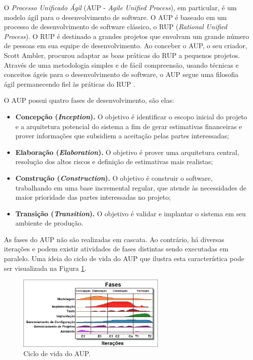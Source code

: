 O \emph{Processo Unificado Ágil} (AUP - \textit{Agile Unified Process}), em particular, é um modelo ágil para o desenvolvimento de software. O AUP é baseado em um processo de desenvolvimento de software clássico, o RUP (\textit{Rational Unified Process}). O RUP é destinado a grandes projetos que envolvam um grande número de pessoas em sua equipe de desenvolvimento. Ao conceber o AUP, o seu criador, Scott Ambler, procurou adaptar as boas práticas do RUP a pequenos projetos. Através de uma metodologia simples e de fácil compreensão, usando técnicas e conceitos ágeis para o desenvolvimento de software, o AUP segue uma filosofia ágil permanecendo fiel às práticas do RUP \cite{Ambler:Livro}.


O AUP possui quatro fases de desenvolvimento, são elas:

\begin{itemize}
	\item \textbf{Concepção (\textit{Inception}).} O objetivo é identificar o escopo inicial do projeto e a arquitetura potencial do sistema a fim de gerar estimativas financeiras e prover informações que subsidiem a aceitação pelas partes interessadas;
	\item \textbf{Elaboração (\textit{Elaboration}).} O objetivo é prover uma arquitetura central, resolução dos altos riscos e definição de estimativas mais realistas;
	\item \textbf{Construção (\textit{Construction}).} O objetivo é construir o software, trabalhando em uma base incremental regular, que atende às necessidades de maior prioridade das partes interessadas no projeto;
	\item \textbf{Transição (\textit{Transition}).} O objetivo é validar e implantar o sistema em seu ambiente de produção.
\end{itemize}

As fases do AUP não são realizadas em cascata. Ao contrário, há diversas iterações e podem existir atividades de fases distintas sendo executadas em paralelo. Uma ideia do ciclo de vida do AUP que ilustra esta característica pode ser visualizada na Figura \ref{fig:aupciclo}.

\begin{figure}[H]
	\centering
	\includegraphics[width=0.65\textwidth]{./img/aupOficial.png}
	\caption{Ciclo de vida do AUP.} \label{fig:aupciclo}
\end{figure}

